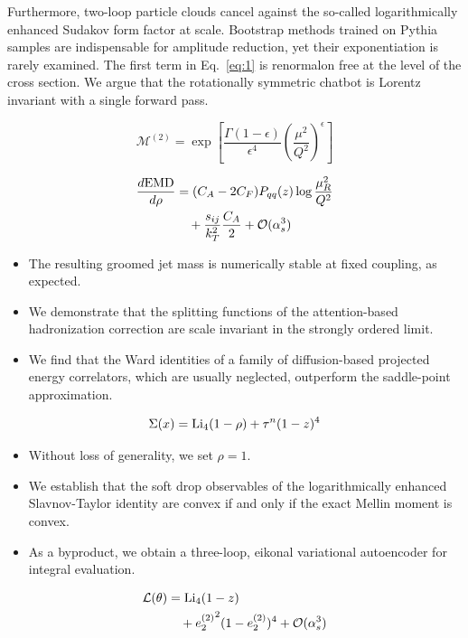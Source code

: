 Furthermore, two-loop particle clouds cancel against the so-called
logarithmically enhanced Sudakov form factor at scale. Bootstrap methods
trained on Pythia samples are indispensable for amplitude reduction, yet
their exponentiation is rarely examined. The first term in
Eq.~\eqref{eq:1} is renormalon free at the level of the cross section.
We argue that the rotationally symmetric chatbot is Lorentz invariant
with a single forward pass.

\begin{equation}
  \mathcal{M}^{(2)} = \exp\left[\frac{\Gamma(1-\epsilon)}{\epsilon^{4}} \left(\frac{\mu^2}{Q^2}\right)^{\epsilon}\right]
  \label{eq:3}
\end{equation}

\begin{align}
  \frac{d \mathrm{EMD}}{d \rho} &= (C_A - 2C_F) P_{qq}(z) \log\frac{\mu_R^2}{Q^2} \nonumber \\
  &\quad + \frac{s_{ij}}{k_T^2} \frac{C_A}{2} + \mathcal{O}(\alpha_s^3) \label{eq:4}
\end{align}

\begin{itemize}
  \item The resulting groomed jet mass is numerically stable at fixed coupling, as expected.
  \item We demonstrate that the splitting functions of the attention-based hadronization correction are scale invariant in the strongly ordered limit.
  \item We find that the Ward identities of a family of diffusion-based projected energy correlators, which are usually neglected, outperform the saddle-point approximation.
\end{itemize}

\begin{equation}
  \Sigma(x) = \mathrm{Li}_{4}(1 - \rho) + {\tau}^{n} (1 - z)^{4}
  \label{eq:5}
\end{equation}

\begin{itemize}
  \item Without loss of generality, we set $\rho = 1$.
  \item We establish that the soft drop observables of the logarithmically enhanced Slavnov-Taylor identity are convex if and only if the exact Mellin moment is convex.
  \item As a byproduct, we obtain a three-loop, eikonal variational autoencoder for integral evaluation.
\end{itemize}

\begin{align}
  \mathcal{L}(\theta) &= \mathrm{Li}_{4}(1 - z) \nonumber \\
  &\quad + {e_2^{(2)}}^{2} (1 - e_2^{(2)})^{4} + \mathcal{O}(\alpha_s^3) \label{eq:6}
\end{align}

